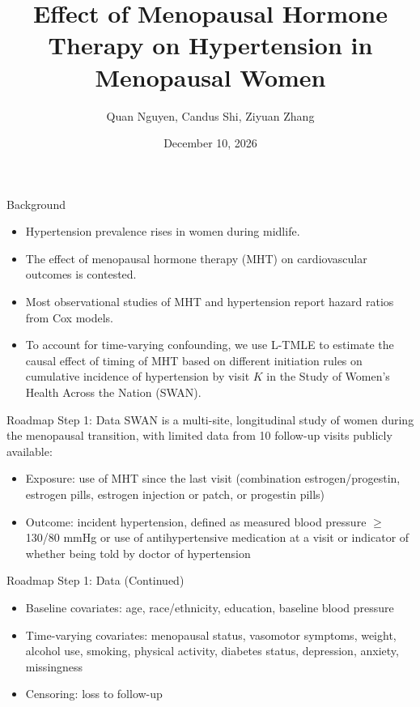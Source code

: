\documentclass[11pt, xcolor={dvipsnames}, usepdftitle=false]{beamer}
\title{Effect of Menopausal Hormone Therapy on Hypertension in Menopausal Women}
\author{Quan Nguyen, Candus Shi, Ziyuan Zhang}
\date{December 10, 2026}
\begin{document}
\frame{\titlepage}

\begin{frame}{Background}
\begin{itemize}
\item Hypertension prevalence rises in women during midlife.
\item The effect of menopausal hormone therapy (MHT) on cardiovascular outcomes is contested.
\item Most observational studies of MHT and hypertension report hazard ratios from Cox models. 
\item To account for time-varying confounding, we use L-TMLE to estimate the causal effect of timing of MHT based on different initiation rules on cumulative incidence of hypertension by visit $K$ in the Study of Women's Health Across the Nation (SWAN). 
\end{itemize}
\end{frame}

\begin{frame}{Roadmap Step 1: Data}
SWAN is a multi-site, longitudinal study of women during the menopausal transition, with limited data from 10 follow-up visits publicly available:
\begin{itemize}
\item Exposure: use of MHT since the last visit (combination estrogen/progestin, estrogen pills, estrogen injection or patch, or progestin pills)
\item Outcome: incident hypertension, defined as measured blood pressure $\geq$ 130/80 mmHg or use of antihypertensive medication at a visit or indicator of whether being told by doctor of hypertension
\end{itemize}
\end{frame}

\begin{frame}{Roadmap Step 1: Data (Continued)} 
\begin{itemize}
    \item Baseline covariates: age, race/ethnicity, education, baseline blood pressure
    \item Time-varying covariates: menopausal status, vasomotor symptoms, weight, alcohol use, smoking, physical activity, diabetes status, depression, anxiety, missingness
\item Censoring: loss to follow-up
\end{itemize}
\end{frame}
\end{document}
